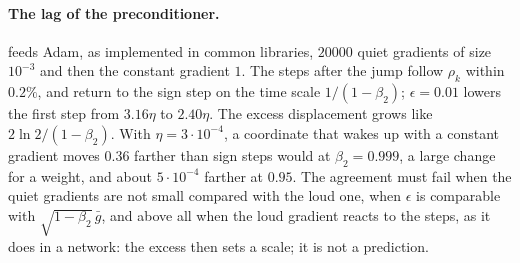 \begin{refsection}
\paragraph{The lag of the preconditioner.}  feeds Adam, as implemented in common libraries, $20000$ quiet gradients of size $10^{-3}$ and then the constant gradient $1$. The steps after the jump follow $\rho_k$ within $0.2\%$, and return to the sign step on the time scale $1/(1-\beta_2)$; $\epsilon=0.01$ lowers the first step from $3.16\eta$ to $2.40\eta$. The excess displacement grows like $2\ln2/(1-\beta_2)$. With $\eta=3\cdot10^{-4}$, a coordinate that wakes up with a constant gradient moves $0.36$ farther than sign steps would at $\beta_2=0.999$, a large change for a weight, and about $5\cdot10^{-4}$ farther at $0.95$. The agreement must fail when the quiet gradients are not small compared with the loud one, when $\epsilon$ is comparable with $\sqrt{1-\beta_2}\,\bar g$, and above all when the loud gradient reacts to the steps, as it does in a network: the excess then sets a scale; it is not a prediction.


\end{refsection}
